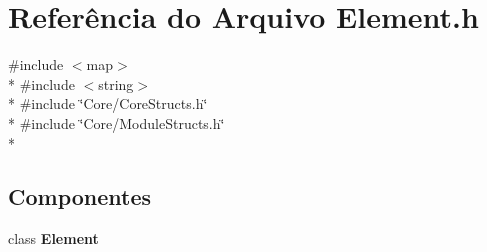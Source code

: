 \section{Referência do Arquivo Element.\+h}
\label{_core_2_element_8h}
{\ttfamily \#include $<$map$>$}\\*
{\ttfamily \#include $<$string$>$}\\*
{\ttfamily \#include \char`\"{}Core/\+Core\+Structs.\+h\char`\"{}}\\*
{\ttfamily \#include \char`\"{}Core/\+Module\+Structs.\+h\char`\"{}}\\*
\subsection*{Componentes}
\begin{DoxyCompactItemize}
\item 
class {\bf Element}
\end{DoxyCompactItemize}
